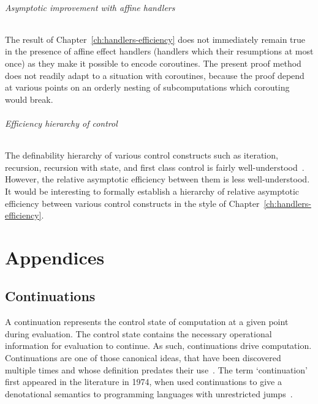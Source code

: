 \documentclass[12pt,phd,lfcs,twoside,openright,logo,leftchapter,normalheadings]{infthesis}
\theoremstyle{plain}
\theoremstyle{definition}
\begin{document}
\paragraph{Asymptotic improvement with affine handlers}
The result of Chapter~\ref{ch:handlers-efficiency} does not
immediately remain true in the presence of affine effect handlers
(handlers which their resumptions at most once) as they make it
possible to encode coroutines. The present proof method does not
readily adapt to a situation with coroutines, because the proof depend
at various points on an orderly nesting of subcomputations which
corouting would break.

\paragraph{Efficiency hierarchy of control} The definability hierarchy
of various control constructs such as iteration, recursion, recursion
with state, and first class control is fairly
well-understood~\cite{LongleyN15,Longley18a,Longley19}. However, the
relative asymptotic efficiency between them is less
well-understood. It would be interesting to formally establish a
hierarchy of relative asymptotic efficiency between various control
constructs in the style of Chapter~\ref{ch:handlers-efficiency}.

\part{Appendices}
\appendix

\chapter{Continuations}
\label{ch:continuations}

A continuation represents the control state of computation at a given
point during evaluation. The control state contains the necessary
operational information for evaluation to continue. As such,
continuations drive computation. %
%
Continuations are one of those canonical ideas, that have been
discovered multiple times and whose definition predates their
use~\cite{Reynolds93}. The term `continuation' first appeared in the
literature in 1974, when \citet{StracheyW74} used continuations to
give a denotational semantics to programming languages with
unrestricted jumps~\cite{StracheyW00}.
\end{document}
